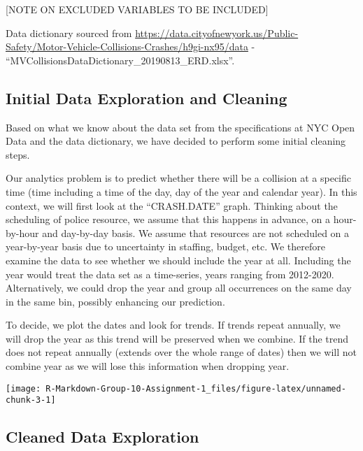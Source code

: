 {[}NOTE ON EXCLUDED VARIABLES TO BE INCLUDED{]}

Data dictionary sourced from
\url{https://data.cityofnewyork.us/Public-Safety/Motor-Vehicle-Collisions-Crashes/h9gi-nx95/data}
- ``MVCollisionsDataDictionary\_20190813\_ERD.xlsx''.

\hypertarget{initial-data-exploration-and-cleaning}{%
\subsection{Initial Data Exploration and
Cleaning}\label{initial-data-exploration-and-cleaning}}

Based on what we know about the data set from the specifications at NYC
Open Data and the data dictionary, we have decided to perform some
initial cleaning steps.

Our analytics problem is to predict whether there will be a collision at
a specific time (time including a time of the day, day of the year and
calendar year). In this context, we will first look at the
``CRASH.DATE'' graph. Thinking about the scheduling of police resource,
we assume that this happens in advance, on a hour-by-hour and day-by-day
basis. We assume that resources are not scheduled on a year-by-year
basis due to uncertainty in staffing, budget, etc. We therefore examine
the data to see whether we should include the year at all. Including the
year would treat the data set as a time-series, years ranging from
2012-2020. Alternatively, we could drop the year and group all
occurrences on the same day in the same bin, possibly enhancing our
prediction.

To decide, we plot the dates and look for trends. If trends repeat
annually, we will drop the year as this trend will be preserved when we
combine. If the trend does not repeat annually (extends over the whole
range of dates) then we will not combine year as we will lose this
information when dropping year.

\begin{Schunk}

\texttt{[image: R-Markdown-Group-10-Assignment-1\_files/figure-latex/unnamed-chunk-3-1]} \end{Schunk}

\hypertarget{cleaned-data-exploration}{%
\subsection{Cleaned Data Exploration}\label{cleaned-data-exploration}}

